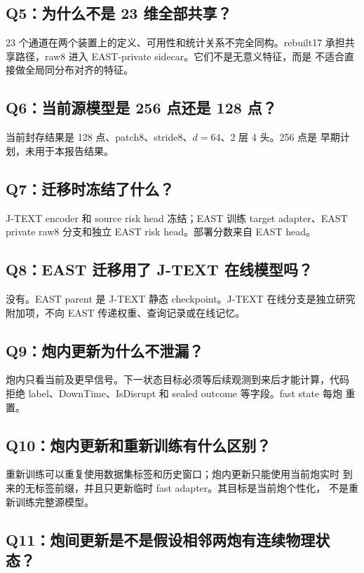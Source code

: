 \documentclass[11pt,a4paper]{article}
\begin{document}
\subsection*{Q5：为什么不是 23 维全部共享？}

23 个通道在两个装置上的定义、可用性和统计关系不完全同构。rebuilt17
承担共享路径，raw8 进入 EAST-private sidecar。它们不是无意义特征，而是
不适合直接做全局同分布对齐的特征。

\subsection*{Q6：当前源模型是 256 点还是 128 点？}

当前封存结果是 128 点、patch8、stride8、\(d=64\)、2 层 4 头。256 点是
早期计划，未用于本报告结果。

\subsection*{Q7：迁移时冻结了什么？}

J-TEXT encoder 和 source risk head 冻结；EAST 训练 target adapter、EAST
private raw8 分支和独立 EAST risk head。部署分数来自 EAST head。

\subsection*{Q8：EAST 迁移用了 J-TEXT 在线模型吗？}

没有。EAST parent 是 J-TEXT 静态 checkpoint。J-TEXT 在线分支是独立研究
附加项，不向 EAST 传递权重、查询记录或在线记忆。

\subsection*{Q9：炮内更新为什么不泄漏？}

炮内只看当前及更早信号。下一状态目标必须等后续观测到来后才能计算，代码
拒绝 label、DownTime、IsDisrupt 和 sealed outcome 等字段。fast state 每炮
重置。

\subsection*{Q10：炮内更新和重新训练有什么区别？}

重新训练可以重复使用数据集标签和历史窗口；炮内更新只能使用当前炮实时
到来的无标签前缀，并且只更新临时 fast adapter。其目标是当前炮个性化，
不是重新训练完整源模型。

\subsection*{Q11：炮间更新是不是假设相邻两炮有连续物理状态？}
\end{document}

